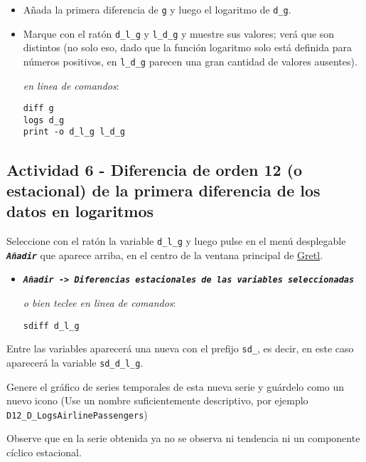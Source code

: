 \documentclass[11pt]{article}
\begin{document}
\begin{itemize}
\item Añada la primera diferencia de \texttt{g} y luego el logaritmo de \texttt{d\_g}.
\item Marque con el ratón \texttt{d\_l\_g} y \texttt{l\_d\_g} y muestre sus valores; verá
que son distintos (no solo eso, dado que la función logaritmo solo
está definida para números positivos, en \texttt{l\_d\_g} parecen una gran
cantidad de valores ausentes).

{\vspace{0pt} \footnotesize \color{gray!70!black}
\emph{en linea de comandos}: 
\begin{verbatim}
diff g
logs d_g
print -o d_l_g l_d_g
\end{verbatim}
}
\end{itemize}

\subsection{Actividad 6 - Diferencia de orden 12 (o estacional) de la primera diferencia de los datos en logaritmos}
\label{sec:orgfeadd6c}
Seleccione con el ratón la variable \texttt{d\_l\_g} y luego pulse en el menú desplegable \textbf{\emph{\texttt{Añadir}}} que aparece arriba, en el centro de la
ventana principal de \href{https://gretl.sourceforge.net/es.html}{Gretl}.
\begin{itemize}
\item \textbf{\emph{\texttt{Añadir -> Diferencias estacionales de las variables seleccionadas}}}

{\vspace{0pt} \footnotesize \color{gray!70!black}
\emph{o bien teclee en linea de comandos}: 
\begin{verbatim}
sdiff d_l_g
\end{verbatim}
}
\end{itemize}

Entre las variables aparecerá una nueva con el prefijo \texttt{sd\_}, es
decir, en este caso aparecerá la variable \texttt{sd\_d\_l\_g}.

Genere el gráfico de series temporales de esta nueva serie y guárdelo
como un nuevo icono (Use un nombre suficientemente descriptivo, por
ejemplo \texttt{D12\_D\_LogsAirlinePassengers})

{\vspace{0pt} \footnotesize \color{gray!70!black}
}

Observe que en la serie obtenida ya no se observa ni tendencia ni un
componente cíclico estacional.
\end{document}
